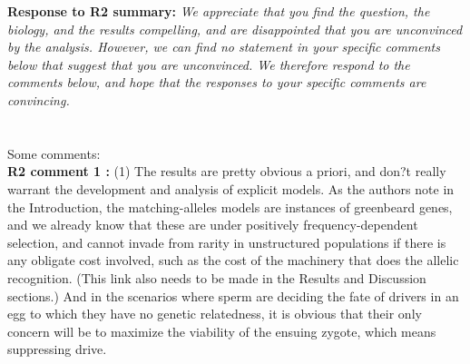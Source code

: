 \documentclass[12pt,letterpaper]{article}
\begin{document}
{\bf{Response to R2 summary:}} \emph{We appreciate that you find the question, the biology, and the results compelling, and are disappointed that you are unconvinced by the analysis. However, we can find no statement in your specific comments below that suggest that you are unconvinced. We therefore respond to the comments below, and hope that the responses to your specific comments are convincing.}
\\
\\
\\
Some comments:
\\
{\bf{R2 comment 1 :}}
(1) The results are pretty obvious a priori, and don?t really warrant the development and analysis of explicit models. As the authors note in the Introduction, the matching-alleles models are instances of greenbeard genes, and we already know that these are under positively frequency-dependent selection, and cannot invade from rarity in unstructured populations if there is any obligate cost involved, such as the cost of the machinery that does the allelic recognition. (This link also needs to be made in the Results and Discussion sections.) And in the scenarios where sperm are deciding the fate of drivers in an egg to which they have no genetic relatedness, it is obvious that their only concern will be to maximize the viability of the ensuing zygote, which means suppressing drive.
\end{document}
